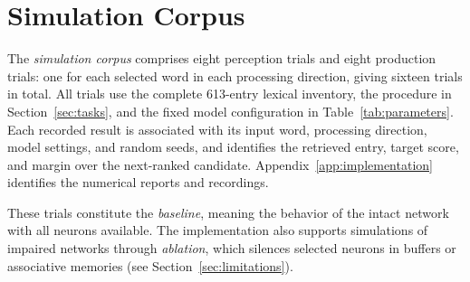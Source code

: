\section{Simulation Corpus}
\label{sec:simulation-corpus}
The \emph{simulation corpus} comprises eight perception trials and eight production trials: one for each selected word in each processing direction, giving sixteen trials in total. All trials use the complete 613-entry lexical inventory, the procedure in Section~\ref{sec:tasks}, and the fixed model configuration in Table~\ref{tab:parameters}. Each recorded result is associated with its input word, processing direction, model settings, and random seeds, and identifies the retrieved entry, target score, and margin over the next-ranked candidate. Appendix~\ref{app:implementation} identifies the numerical reports and recordings.

These trials constitute the \emph{baseline}, meaning the behavior of the intact network with all neurons available. The implementation also supports simulations of impaired networks through \emph{ablation}, which silences selected neurons in buffers or associative memories (see Section~\ref{sec:limitations}).
